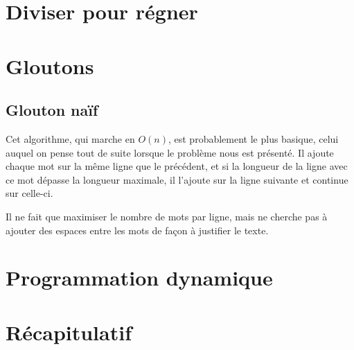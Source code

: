 \documentclass{article}
\begin{document}
\section{Diviser pour régner}

\section{Gloutons}

\subsection{Glouton naïf}

Cet algorithme, qui marche en $O(n)$, est probablement le plus basique, celui
auquel on pense tout de suite lorsque le problème nous est présenté. Il ajoute
chaque mot sur la même ligne que le précédent, et si la longueur de la ligne
avec ce mot dépasse la longueur maximale, il l'ajoute sur la ligne suivante et
continue sur celle-ci.

Il ne fait que maximiser le nombre de mots par ligne, mais ne cherche pas à
ajouter des espaces entre les mots de façon à justifier le texte.

\section{Programmation dynamique}

\section{Récapitulatif}
\end{document}
